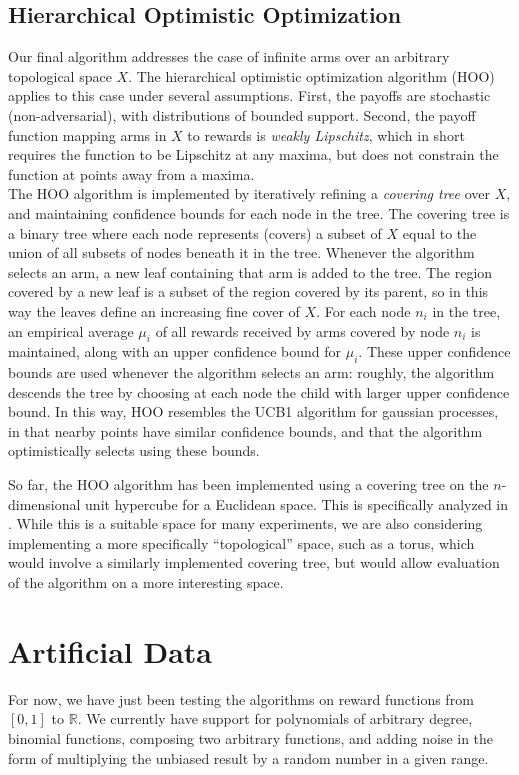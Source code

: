 \documentclass{article}
\begin{document}
\subsection{Hierarchical Optimistic Optimization}
Our final algorithm addresses the case of infinite arms over an
arbitrary topological space $X$. The hierarchical optimistic
optimization algorithm (HOO) applies to this case under several
assumptions. First, the payoffs are stochastic (non-adversarial), with
distributions of bounded support. Second, the payoff function mapping
arms in $X$ to rewards is \emph{weakly Lipschitz}, which in short requires
the function to be Lipschitz at any maxima, but does not constrain the
function at points away from a maxima.
\\
The HOO algorithm is implemented by iteratively refining a
\emph{covering tree} over $X$, and maintaining confidence bounds
for each node in the tree. The covering tree is a binary tree where
each node represents (covers) a subset of $X$ equal to the union of
all subsets of nodes beneath it in the tree. Whenever the algorithm
selects an arm, a new leaf containing that arm is added to the
tree. The region covered by a new leaf is a subset of the region
covered by its parent, so in this way the leaves define an increasing
fine cover of $X$. For each node $n_i$ in the tree, an empirical
average $\mu_i$ of all rewards received by arms covered by node $n_i$
is maintained, along with an upper confidence bound for
$\mu_i$. These upper confidence bounds are used whenever the algorithm
selects an arm: roughly, the algorithm descends the tree by choosing
at each node the child with larger upper confidence bound. In this
way, HOO resembles the UCB1 algorithm for gaussian processes, in that
nearby points have similar confidence bounds, and that the algorithm
optimistically selects using these bounds.

So far, the HOO algorithm has been implemented using a covering tree
on the $n$-dimensional unit hypercube for a Euclidean space. This is
specifically analyzed in \cite{xArmed}. While this is a suitable space
for many experiments, we are also considering implementing a more
specifically ``topological'' space, such as a torus, which would
involve a similarly implemented covering tree, but would allow
evaluation of the algorithm on a more interesting space.  \\
\section{Artificial Data}
For now, we have just been testing the algorithms on reward functions from
$[0,1]$ to $\mathbb{R}$.  We currently have support for polynomials
of arbitrary degree, binomial functions, composing two arbitrary functions,
and adding noise in the form of multiplying the unbiased result by a random
number in a given range.
\end{document}
